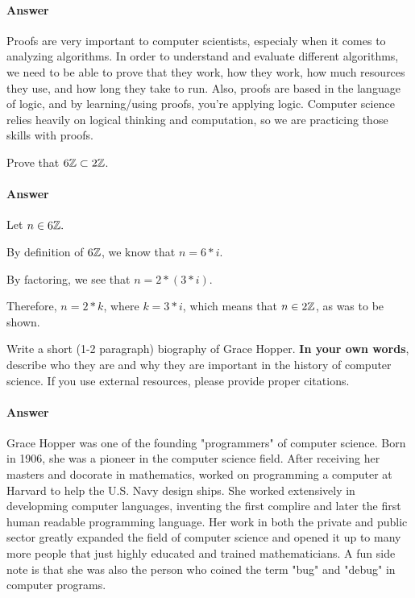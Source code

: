 \documentclass{article}
\begin{document}
\paragraph{Answer}

Proofs are very important to computer scientists, especialy when it comes to analyzing algorithms. In order to understand and evaluate different algorithms, we need to be able to prove that they work, how they work, how much resources they use, and how long they take to run. Also, proofs are based in the language of logic, and by learning/using proofs, you're applying logic. Computer science relies heavily on logical thinking and computation, so we are practicing those skills with proofs.



Prove that $6{\mathbb Z} \subset 2{\mathbb Z}$.

\paragraph{Answer}

Let $n \in 6{\mathbb Z}.$ 

By definition of $6{\mathbb Z}$, we know that $n= 6*i$.

By factoring, we see that $n=2 * (3 * i)$.

Therefore, $n=2*k$, where $k=3*i$, which means that $n \in 2{\mathbb Z}$, as was to be shown.



Write a short (1-2 paragraph) biography of Grace Hopper.
\textbf{In your own words}, describe who they are and why they are important in
the history of computer science.  If you use external resources, please provide
proper citations.

\paragraph{Answer}

Grace Hopper was one of the founding "programmers" of computer science. Born in 1906, she was a pioneer in the computer science field. After receiving her masters and docorate in mathematics, worked on programming a computer at Harvard to help the U.S. Navy design ships. She worked extensively in developming computer languages, inventing the first complire and later the first human readable programming language. Her work in both the private and public sector greatly expanded the field of computer science and opened it up to many more people that just highly educated and trained mathematicians. A fun side note is that she was also the person who coined the term "bug" and "debug" in computer programs.
\end{document}
